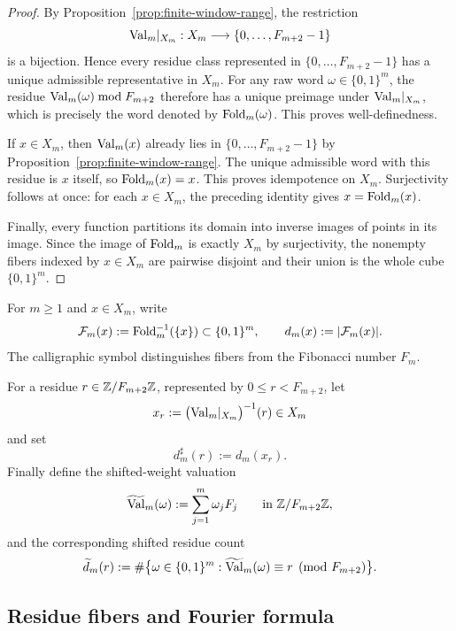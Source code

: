 \begin{proof}
By Proposition~\ref{prop:finite-window-range}, the restriction
\[
\mathrm{Val}_m|_{X_m}:X_m\longrightarrow \{0,\ldots,F_{m+2}-1\}
\]
is a bijection.  Hence every residue class represented in
$\{0,\ldots,F_{m+2}-1\}$ has a unique admissible representative in $X_m$.
For any raw word $\omega\in\{0,1\}^m$, the residue
$\mathrm{Val}_m(\omega)\bmod F_{m+2}$ therefore has a unique preimage under
$\mathrm{Val}_m|_{X_m}$, which is precisely the word denoted by $\mathrm{Fold}_m(\omega)$.
This proves well-definedness.

If $x\in X_m$, then $\mathrm{Val}_m(x)$ already lies in
$\{0,\ldots,F_{m+2}-1\}$ by Proposition~\ref{prop:finite-window-range}.
The unique admissible word with this residue is $x$ itself, so
$\mathrm{Fold}_m(x)=x$.  This proves idempotence on $X_m$.  Surjectivity follows at
once: for each $x\in X_m$, the preceding identity gives $x=\mathrm{Fold}_m(x)$.

Finally, every function partitions its domain into inverse images of points in
its image.  Since the image of $\mathrm{Fold}_m$ is exactly $X_m$ by surjectivity, the
nonempty fibers indexed by $x\in X_m$ are pairwise disjoint and their union is
the whole cube $\{0,1\}^m$.
\end{proof}

\ifdefined\IncludeSupplementaryConsequences
\begin{definition}\label{def:fiber-notation-and-residue-counts}
For $m\ge1$ and $x\in X_m$, write
\[
\mathcal F_m(x):=\mathrm{Fold}_m^{-1}(\{x\})\subset\{0,1\}^m,
\qquad
d_m(x):=|\mathcal F_m(x)|.
\]
The calligraphic symbol distinguishes fibers from the Fibonacci number $F_m$.

For a residue $r\in\mathbb{Z}/F_{m+2}\mathbb{Z}$, represented by
$0\le r<F_{m+2}$, let
\[
x_r:=\bigl(\mathrm{Val}_m|_{X_m}\bigr)^{-1}(r)\in X_m
\]
and set
\[
d_m^\sharp(r):=d_m(x_r).
\]
Finally define the shifted-weight valuation
\[
\widetilde{\mathrm{Val}}_m(\omega):=\sum_{j=1}^m \omega_j F_j
\qquad\text{in }\mathbb{Z}/F_{m+2}\mathbb{Z},
\]
and the corresponding shifted residue count
\[
\widetilde d_m(r):=
\#\bigl\{\omega\in\{0,1\}^m:
\widetilde{\mathrm{Val}}_m(\omega)\equiv r\pmod {F_{m+2}}\bigr\}.
\]
\end{definition}

\subsection{Residue fibers and Fourier formula}\label{sec:stab:fiber}

